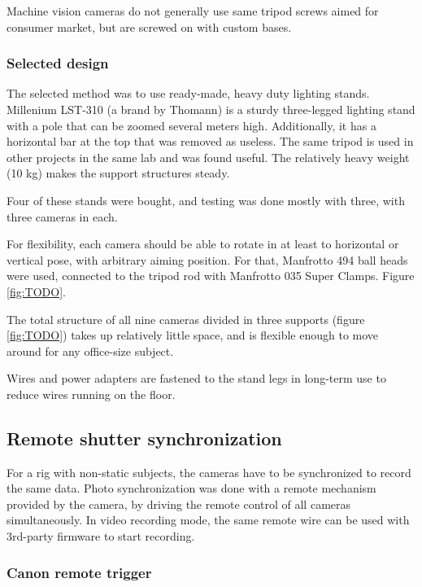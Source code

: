 Machine vision cameras do not generally use same tripod screws aimed for consumer market, but are screwed on with custom bases.

\subsubsection{Selected design}

The selected method was to use ready-made, heavy duty lighting stands.
Millenium LST-310 (a brand by Thomann) is a sturdy three-legged lighting stand with a pole that can be zoomed several meters high.
Additionally, it has a horizontal bar at the top that was removed as useless.
The same tripod is used in other projects in the same lab and was found useful.
The relatively heavy weight (10 kg) makes the support structures steady. %

Four of these stands were bought, and testing was done mostly with three, with three cameras in each.

For flexibility, each camera should be able to rotate in at least to horizontal or vertical pose, with arbitrary aiming position.
For that, Manfrotto 494 ball heads were used, connected to the tripod rod with Manfrotto 035 Super Clamps. Figure \ref{fig:TODO}.

The total structure of all nine cameras divided in three supports (figure \ref{fig:TODO}) takes up relatively little space, and is flexible enough to move around for any office-size subject.

Wires and power adapters are fastened to the stand legs in long-term use to reduce wires running on the floor.


\subsection{Remote shutter synchronization} %

For a rig with non-static subjects, the cameras have to be synchronized to record the same data.
Photo synchronization was done with a remote mechanism provided by the camera, by driving the remote control of all cameras simultaneously.
In video recording mode, the same remote wire can be used with 3rd-party firmware to start recording.


\subsubsection{Canon remote trigger} %

